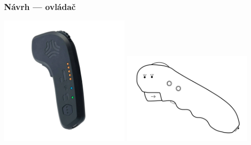   \begin{frame}
    \frametitle{Návrh --- ovládač}
    \centering\includegraphics[width=0.48\textwidth]{figures/brand-reviews/boosted-controller.png}
    \centering\includegraphics[width=0.48\textwidth]{figures/controller.pdf}
  \end{frame}
  
